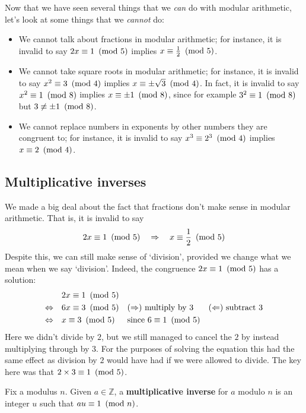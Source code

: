 \begin{example}
Now that we have seen several things that we \textit{can} do with modular arithmetic, let's look at some things that we \textit{cannot} do:
\begin{itemize}
\item We cannot talk about fractions in modular arithmetic; for instance, it is invalid to say $2x \equiv 1 ~\left(\text{mod}~5\right)$ implies $x \equiv \frac{1}{2} ~\left(\text{mod}~5\right)$.
\item We cannot take square roots in modular arithmetic; for instance, it is invalid to say $x^2 \equiv 3 ~\left(\text{mod}~4\right)$ implies $x \equiv \pm \sqrt{3} ~\left(\text{mod}~4\right)$. In fact, it is invalid to say $x^2 \equiv 1 ~\left(\text{mod}~8\right)$ implies $x \equiv \pm 1 ~\left(\text{mod}~8\right)$, since for example $3^2 \equiv 1 ~\left(\text{mod}~8\right)$ but $3 \not\equiv \pm 1 ~\left(\text{mod}~8\right)$.
\item We cannot replace numbers in exponents by other numbers they are congruent to; for instance, it is invalid to say $x^3 \equiv 2^3 ~\left(\text{mod}~4\right)$ implies $x \equiv 2 ~\left(\text{mod}~4\right)$.
\end{itemize}
\end{example}

\subsection*{Multiplicative inverses}

We made a big deal about the fact that fractions don't make sense in modular arithmetic. That is, it is invalid to say
\[ 2x \equiv 1 ~\left(\text{mod}~5\right) \quad \Rightarrow \quad x \equiv \frac{1}{2} ~\left(\text{mod}~5\right) \]
Despite this, we can still make sense of `division', provided we change what we mean when we say `division'. Indeed, the congruence $2x \equiv 1 ~\left(\text{mod}~5\right)$ has a solution:
\begin{align*}
& 2x \equiv 1 ~\left(\text{mod}~5\right) && && \\
\Leftrightarrow\quad & 6x \equiv 3 ~\left(\text{mod}~5\right) && \text{($\Rightarrow$) multiply by $3$} && \text{($\Leftarrow$) subtract $3$} \\
\Leftrightarrow\quad & x \equiv 3 ~\left(\text{mod}~5\right) && \text{since $6 \equiv 1 ~\left(\text{mod}~5\right)$}
\end{align*}
Here we didn't divide by $2$, but we still managed to cancel the $2$ by instead multiplying through by $3$. For the purposes of solving the equation this had the same effect as division by $2$ would have had if we were allowed to divide. The key here was that $2 \times 3 \equiv 1 ~\left(\text{mod}~5\right)$.

\begin{definition}\label{multiplicative inverse}
Fix a modulus $n$. Given $a \in \mathbb{Z}$, a \textbf{multiplicative inverse} for $a$ modulo $n$ is an integer $u$ such that $au \equiv 1 ~\left(\text{mod}~n\right)$.
\end{definition}

